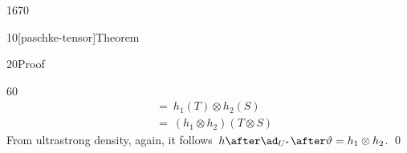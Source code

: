 \begin{parsec}{1670}
\begin{point}{10}[paschke-tensor]{Theorem}
\begin{point}{20}{Proof}
\begin{point}{60}
\begin{align*}
        & \ = \
        h_1(T) \otimes h_2(S) \\
        & \ = \
        (h_1\otimes h_2)(T \otimes S)
\end{align*}
From ultrastrong density, again, it
    follows~$h \after \ad_{U^*} \after \vartheta = h_1 \otimes h_2$. \qed
\end{point}
\end{point}
\end{point}
\end{parsec}

